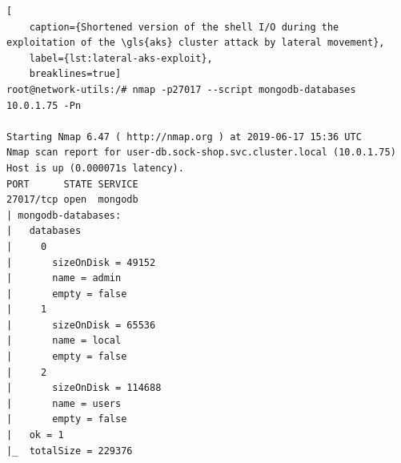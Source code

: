 \begin{lstlisting}[
	caption={Shortened version of the shell I/O during the exploitation of the \gls{aks} cluster attack by lateral movement},
	label={lst:lateral-aks-exploit},
	breaklines=true]
root@network-utils:/# nmap -p27017 --script mongodb-databases 10.0.1.75 -Pn

Starting Nmap 6.47 ( http://nmap.org ) at 2019-06-17 15:36 UTC
Nmap scan report for user-db.sock-shop.svc.cluster.local (10.0.1.75)
Host is up (0.000071s latency).
PORT      STATE SERVICE
27017/tcp open  mongodb
| mongodb-databases:
|   databases
|     0
|       sizeOnDisk = 49152
|       name = admin
|       empty = false
|     1
|       sizeOnDisk = 65536
|       name = local
|       empty = false
|     2
|       sizeOnDisk = 114688
|       name = users
|       empty = false
|   ok = 1
|_  totalSize = 229376


\end{lstlisting}
